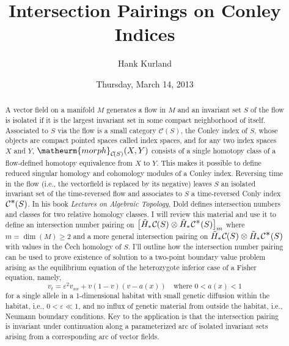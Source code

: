 \documentclass{UAmathtalk}
\author{Hank Kurland}
\title{Intersection Pairings on Conley Indices}
\date{Thursday, March 14, 2013}
\newcommand*{\da}{{\mathchoice{}{}{\textstyle*}{\scriptstyle*}}}
\newcommand*{\tensor}{\otimes}
\newcommand*{\cC}{{\mathcal{C}}}
\newcommand*{\tH}{{\tilde H}}
\newcommand*{\CI}[1]{{\cC\!\left(#1\right)}}
\newcommand*{\rtCI}[1]{\cC^\da\mspace{-4mu}\left(#1\right)}
\newcommand*{\morph}[1]{\mbox{\sf morph$_{#1}$}}
\newcommand*{\tHI}[2]{\tH_{#1}\mspace{1mu}\cC\mspace{-4mu}\left(#2\right)}
\newcommand*{\tHrI}[2]{\tH_{#1}\mspace{1mu}\cC^\da\!\left(#2\right)}
\renewcommand*{\morph}[1]{\matheurm{morph}_{#1}}
\begin{document}
\maketitle

\begin{abstract}
A vector field on a manifold $M$ generates a flow in $M$ and an invariant set $S$ of the flow is isolated if it is the largest invariant set in some compact neighborhood of itself.
Associated to $S$ via the flow is a small category $\CI{S}$, the Conley index of $S$, whose objects are compact pointed spaces called index spaces, and for any two index spaces $X$ and $Y$, $\morph{\CI{S}}(X,Y)$ consists of a single homotopy class of a flow-defined homotopy equivalence from $X$ to $Y$.
This makes it possible to define reduced singular homology and cohomology modules of a Conley index.
Reversing time in the flow (i.e., the vectorfield is replaced by its negative) leaves $S$ an isolated invariant set of the time-reversed flow and associates to $S$ a time-reversed Conly index $\rtCI{S}$.
In his book \textit{Lectures on Algebraic Topology}, Dold defines intersection numbers and classes for two relative homology classes.
I will review this material and use it to define an intersection number pairing on $\left[\tHI{*}{S}\tensor\tHrI{*}{S}\right]_m$ where $m=\dim(M)\ge2$ and a more general intersection pairing on $\tHI{*}{S}\tensor\tHrI{*}{S}$ with values in the \v{C}ech homology of $S$.
I'll outline how the intersection number pairing can be used to prove existence of solution to a two-point boundary value problem arising as the equilibrium equation of the heterozygote inferior case of a Fisher equation, namely, \[
  v_t=\varepsilon^2 v_{xx}+v(1-v)(v-a(x))\quad\text{where $0<a(x)<1$}
\]
for a single allele in a 1-dimensional habitat with small genetic diffusion within the habitat, i.e., $0<\varepsilon\ll1$, and no influx of genetic material from outside the habitat, i.e., Neumann boundary conditions.
Key to the application is that the intersection pairing is invariant under continuation along a parameterized arc of isolated invariant sets arising from a corresponding arc of vector fields.

\end{abstract}
\end{document}
